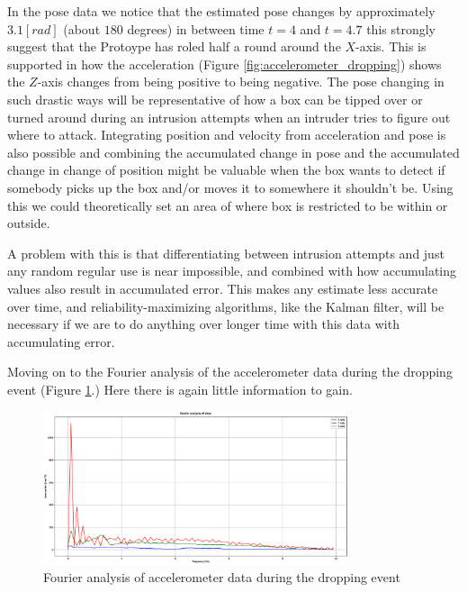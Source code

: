\documentclass[../main.tex]{subfiles}
\begin{document}
In the pose data we notice that the estimated pose changes by approximately $3.1 [rad]$ (about $180$ degrees) in between time $t=4$ and $t=4.7$ this strongly suggest that the Protoype has roled half a round around the $X$-axis. This is supported in how the acceleration (Figure \ref{fig:accelerometer_dropping}) shows the $Z$-axis changes from being positive to being negative.
The pose changing in such drastic ways will be representative of how a box can be tipped over or turned around during an intrusion attempts when an intruder tries to figure out where to attack. Integrating position and velocity from acceleration and pose is also possible and combining the accumulated change in pose and the accumulated change in change of position might be valuable when the box wants to detect if somebody picks up the box and/or moves it to somewhere it shouldn't be. Using this we could theoretically set an area of where box is restricted to be within or outside.

A problem with this is that differentiating between intrusion attempts and just any random regular use is near impossible, and combined with how accumulating values also result in accumulated error. This makes any estimate less accurate over time, and reliability-maximizing algorithms, like the Kalman filter, will be necessary if we are to do anything over longer time with this data with accumulating error.


Moving on to the Fourier analysis of the accelerometer data during the
dropping event (Figure \ref{fig:fourier_accelerometer_dropping}.)
Here there is again little information to gain.

\begin{figure}[htbp]
    \centering
    \includegraphics[width=0.8\textwidth]{resources/figures/Fourier_acceleration_drop.eps}
    \caption{Fourier analysis of accelerometer data during the dropping event}
    \label{fig:fourier_accelerometer_dropping}
\end{figure}
\end{document}

